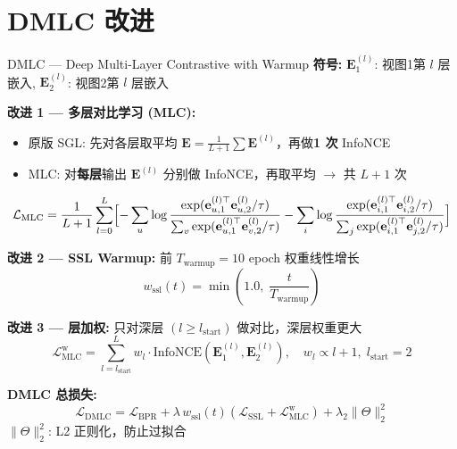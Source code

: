 \documentclass[9pt, aspectratio=169]{ctexbeamer}
\begin{document}
\section{DMLC 改进}
\begin{frame}{DMLC --- Deep Multi-Layer Contrastive with Warmup}
  \textbf{符号:} $\mathbf{E}_1^{(l)}$: 视图1第 $l$ 层嵌入, $\mathbf{E}_2^{(l)}$: 视图2第 $l$ 层嵌入

  \vspace{0.3em}
  \textbf{改进 1 --- 多层对比学习 (MLC):}
  \begin{itemize}\footnotesize
    \item 原版 SGL: 先对各层取平均 $\mathbf{E}=\frac{1}{L+1}\sum\mathbf{E}^{(l)}$，再做\textbf{1 次} InfoNCE
    \item MLC: 对\textbf{每层}输出 $\mathbf{E}^{(l)}$ 分别做 InfoNCE，再取平均 $\to$ 共 $L+1$ 次
  \end{itemize}
  \vspace{-0.2em}
  \begin{equation*}
    \mathcal{L}_{\text{MLC}} = \frac{1}{L+1}\sum_{l=0}^{L}
    \Bigl[ -\sum_{u}\log\frac{\exp(\mathbf{e}_{u,1}^{(l)\top}\mathbf{e}_{u,2}^{(l)}/\tau)}{\sum_v\exp(\mathbf{e}_{u,1}^{(l)\top}\mathbf{e}_{v,2}^{(l)}/\tau)}
    - \sum_{i}\log\frac{\exp(\mathbf{e}_{i,1}^{(l)\top}\mathbf{e}_{i,2}^{(l)}/\tau)}{\sum_j\exp(\mathbf{e}_{i,1}^{(l)\top}\mathbf{e}_{j,2}^{(l)}/\tau)} \Bigr]
  \end{equation*}

  \textbf{改进 2 --- SSL Warmup:} 前 $T_{\text{warmup}}=10$ epoch 权重线性增长
  \begin{equation*}
    w_{\text{ssl}}(t) = \min\!\left(1.0,\; \frac{t}{T_{\text{warmup}}}\right)
  \end{equation*}

  \textbf{改进 3 --- 层加权:} 只对深层 $(l\geq l_{\text{start}})$ 做对比，深层权重更大
  \begin{equation*}
    \mathcal{L}_{\text{MLC}}^{\text{w}} = \sum_{l=l_{\text{start}}}^{L} w_l \cdot \text{InfoNCE}(\mathbf{E}_1^{(l)}, \mathbf{E}_2^{(l)}),\quad
    w_l \propto l+1,\; l_{\text{start}}=2
  \end{equation*}

  \textbf{DMLC 总损失:}
  \begin{equation*}
    \mathcal{L}_{\text{DMLC}} = \mathcal{L}_{\text{BPR}} + \lambda\, w_{\text{ssl}}(t)(\mathcal{L}_{\text{SSL}} + \mathcal{L}_{\text{MLC}}^{\text{w}}) + \lambda_2 \|\Theta\|_2^2
  \end{equation*}
  $\|\Theta\|_2^2$: L2 正则化，防止过拟合
\end{frame}
\end{document}
